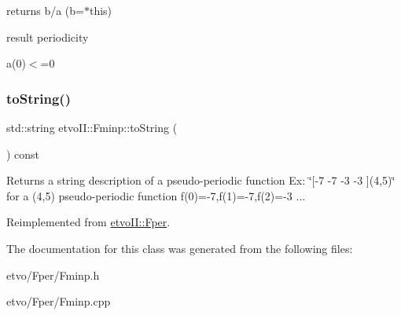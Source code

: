 returns b/a (b=$\ast$this)

result periodicity

a(0)$<$=0 \mbox{\label{classetvo_i_i_1_1_fminp_a84497665aaf322cf0606257ca543108e}} 
\subsubsection{\texorpdfstring{to\+String()}{toString()}}
{\footnotesize\ttfamily std\+::string etvo\+I\+I\+::\+Fminp\+::to\+String (\begin{DoxyParamCaption}{ }\end{DoxyParamCaption}) const\hspace{0.3cm}{\ttfamily [virtual]}}

Returns a string description of a pseudo-\/periodic function Ex\+: \char`\"{}\mbox{[}-\/7 -\/7 -\/3 -\/3 \mbox{]}(4,5)\char`\"{} for a (4,5) pseudo-\/periodic function f(0)=-\/7,f(1)=-\/7,f(2)=-\/3 ... 

Reimplemented from \mbox{\hyperlink{classetvo_i_i_1_1_fper_a53276a36ff7ada879be26655ccff7ed6}{etvo\+I\+I\+::\+Fper}}.



The documentation for this class was generated from the following files\+:\begin{DoxyCompactItemize}
\item 
etvo/\+Fper/Fminp.\+h\item 
etvo/\+Fper/Fminp.\+cpp\end{DoxyCompactItemize}
